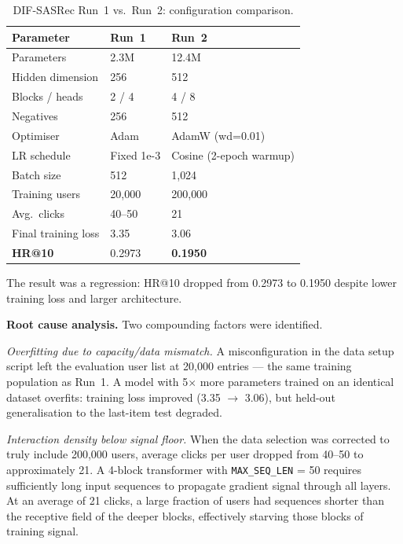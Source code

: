 \begin{table}[H]
\centering
\caption{DIF-SASRec Run~1 vs.\ Run~2: configuration comparison.}
\label{tab:train_run2}
\begin{tabular}{lll}
\hline
\textbf{Parameter}   & \textbf{Run~1} & \textbf{Run~2} \\
\hline
Parameters           & 2.3M           & 12.4M \\
Hidden dimension     & 256            & 512 \\
Blocks / heads       & 2 / 4          & 4 / 8 \\
Negatives            & 256            & 512 \\
Optimiser            & Adam           & AdamW (wd=0.01) \\
LR schedule          & Fixed 1e-3     & Cosine (2-epoch warmup) \\
Batch size           & 512            & 1{,}024 \\
Training users       & 20{,}000       & 200{,}000 \\
Avg.\ clicks         & 40--50         & 21 \\
Final training loss  & 3.35           & 3.06 \\
\hline
\textbf{HR@10}       & 0.2973         & \textbf{0.1950} \\
\hline
\end{tabular}
\end{table}

The result was a regression: HR@10 dropped from 0.2973 to 0.1950 despite lower training loss and larger architecture.

\textbf{Root cause analysis.}
Two compounding factors were identified.

\emph{Overfitting due to capacity/data mismatch.}
A misconfiguration in the data setup script left the evaluation user list at 20{,}000 entries — the same training population as Run~1.
A model with 5$\times$ more parameters trained on an identical dataset overfits: training loss improved (3.35 $\to$ 3.06), but held-out generalisation to the last-item test degraded.

\emph{Interaction density below signal floor.}
When the data selection was corrected to truly include 200{,}000 users, average clicks per user dropped from 40--50 to approximately 21.
A 4-block transformer with \texttt{MAX\_SEQ\_LEN} = 50 requires sufficiently long input sequences to propagate gradient signal through all layers.
At an average of 21 clicks, a large fraction of users had sequences shorter than the receptive field of the deeper blocks, effectively starving those blocks of training signal.

